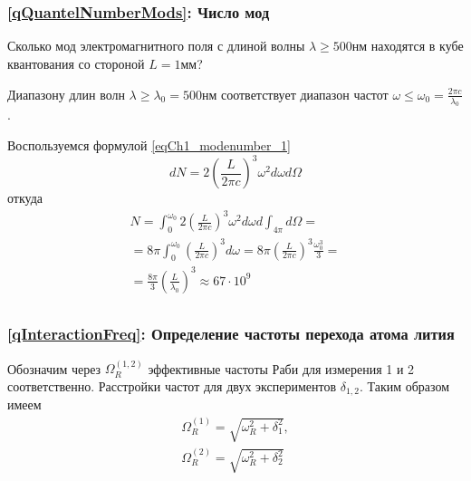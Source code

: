 \chapter{}

\section{} 

\subsection{\ref{qQuantelNumberMods}: Число мод}
Сколько мод электромагнитного поля с длиной волны
  $\lambda \ge 500 \mbox{нм}$ находятся в кубе квантования со стороной
$L=1 \mbox{мм}$?

Диапазону длин волн $\lambda \ge \lambda_0 = 500 \mbox{нм}$
соответствует диапазон частот
$\omega \le \omega_0 = \frac{2 \pi c}{\lambda_0}$.

Воспользуемся формулой \ref{eqCh1_modenumber_1}
\[
d N = 2 \left(\frac{L}{2 \pi c} \right)^3 \omega^2 d \omega d \Omega
\]
откуда
\begin{eqnarray}
  N = \int_0^{\omega_0} 2 \left(\frac{L}{2 \pi c} \right)^3 \omega^2 d
  \omega d \int_{4 \pi} d \Omega =
  \nonumber \\
  = 8 \pi \int_0^{\omega_0} \left(\frac{L}{2 \pi c} \right)^3 d \omega
  = 8 \pi \left(\frac{L}{2 \pi c}\right)^3 \frac{\omega_0^3}{3} =
  \nonumber \\
  = \frac{8 \pi}{3} \left(\frac{L}{\lambda_0}\right)^3 \approx 67
  \cdot 10^9
  \nonumber
\end{eqnarray}


\section{}

\subsection{\ref{qInteractionFreq}: Определение частоты перехода атома
лития} 



Обозначим через $\Omega_R^{(1,2)}$ эффективные частоты Раби для
измерения 1 и 2 соответственно. Расстройки частот для двух
экспериментов $\delta_{1,2}$. Таким образом имеем
\begin{eqnarray}
  \Omega_R^{(1)} = \sqrt{\omega_R^2 + \delta_1^2},
  \nonumber \\
  \Omega_R^{(2)} = \sqrt{\omega_R^2 + \delta_2^2}
  \label{eqAnswersInteraction40}
\end{eqnarray}

